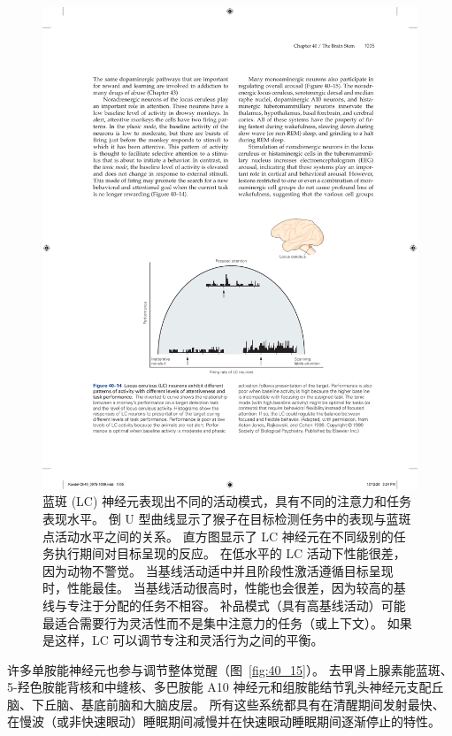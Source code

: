 \begin{figure}[htbp]
	\centering
	\includegraphics[width=0.65\linewidth]{chap40/fig_40_14}
	\caption{蓝斑 (LC) 神经元表现出不同的活动模式，具有不同的注意力和任务表现水平。
		倒 U 型曲线显示了猴子在目标检测任务中的表现与蓝斑点活动水平之间的关系。
		直方图显示了 LC 神经元在不同级别的任务执行期间对目标呈现的反应。
		在低水平的 LC 活动下性能很差，因为动物不警觉。
		当基线活动适中并且阶段性激活遵循目标呈现时，性能最佳。
		当基线活动很高时，性能也会很差，因为较高的基线与专注于分配的任务不相容。
		补品模式（具有高基线活动）可能最适合需要行为灵活性而不是集中注意力的任务（或上下文）。
		如果是这样，LC 可以调节专注和灵活行为之间的平衡\cite{aston1999role}。}
	\label{fig:40_14}
\end{figure}


许多单胺能神经元也参与调节整体觉醒（图~\ref{fig:40_15}）。
去甲肾上腺素能蓝斑、5-羟色胺能背核和中缝核、多巴胺能 A10 神经元和组胺能结节乳头神经元支配丘脑、下丘脑、基底前脑和大脑皮层。
所有这些系统都具有在清醒期间发射最快、在慢波（或非快速眼动）睡眠期间减慢并在快速眼动睡眠期间逐渐停止的特性。


